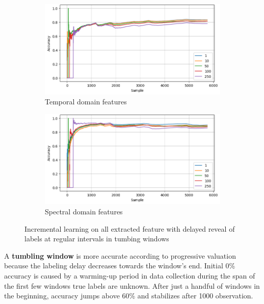 \begin{figure}[ht]
    \centering
    \begin{subfigure}[b]{0.49\textwidth}
        \includegraphics[width=\textwidth]{assets/design/gradual-learning-delay-temporal-domain-fault.png}
        \caption{Temporal domain features}
    \end{subfigure}
    \hfill
    \begin{subfigure}[b]{0.49\textwidth}
        \includegraphics[width=\textwidth]{assets/design/gradual-learning-delay-spectral-domain-fault.png}
        \caption{Spectral domain features}
    \end{subfigure}
    \caption{Incremental learning on all extracted feature with delayed reveal of labels at regular intervals in tumbing windows}
    \label{fig:design:online-fault-delay-tumbling}
\end{figure}

A \textbf{tumbling window} is more accurate according to progressive valuation because the labeling delay decreases towards the window's end. Initial 0\% accuracy is caused by a warming-up period in data collection during the span of the first few windows true labels are unknown. After just a handful of windows in the beginning, accuracy jumps above 60\% and stabilizes after 1000 observation.

